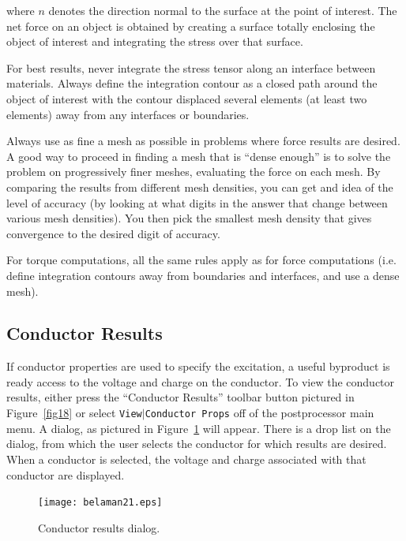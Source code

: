 \documentclass[12pt]{report}
\begin{document}
\noindent
where $n$ denotes the direction normal to the surface at the point of interest.
The net force on an object is obtained by creating a surface totally
enclosing the object of interest and integrating the stress over that
surface.

For best results, never integrate the stress tensor along an interface
between materials. Always define the integration contour as a closed path
around the object of interest with the contour displaced several elements
(at least two elements) away from any interfaces or boundaries.

Always use as fine a mesh as possible in problems where force results are
desired. A good way to proceed in finding a mesh that is ``dense enough'' is
to solve the problem on progressively finer meshes, evaluating the force on
each mesh. By comparing the results from different mesh densities, you can
get and idea of the level of accuracy (by looking at what digits in the
answer that change between various mesh densities). You then pick the
smallest mesh density that gives convergence to the desired digit of
accuracy.

For torque computations, all the same rules apply as for force computations
(i.e. define integration contours away from boundaries and interfaces, and
use a dense mesh).

\subsection{Conductor Results}

If conductor properties are used to specify the excitation, a
useful byproduct is ready access to the voltage and charge on the
conductor. To view the conductor results, either press the ``Conductor Results''
toolbar button pictured in Figure~\ref{fig18} or select \texttt{View$\vert
$Conductor Props} off of the postprocessor main menu. A dialog, as
pictured in Figure~\ref{fig21} will appear. There is a drop list on the
dialog, from which the user selects the conductor for which results
are desired. When a conductor is selected, the voltage and charge
associated with that conductor are displayed.

\begin{figure}[htbp]
\centerline{\texttt{[image: belaman21.eps]}}
\caption{Conductor results dialog.}
\label{fig21}
\end{figure}


\end{document}
